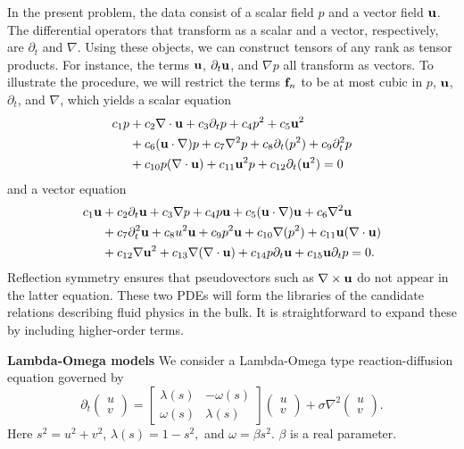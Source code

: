 \documentclass[
 reprint,
 amsmath,amssymb,
 aps,
]{revtex4-2}
\begin{document}
In the present problem, the data consist of a scalar field $p$ and a vector field ${\bf u}$. The differential operators that transform as a scalar and a vector, respectively, are $\partial_t$ and $\nabla$. Using these objects, we can construct tensors of any rank as tensor products. For instance, the terms ${\bf u}$, $\partial_t{\bf u}$, and $\nabla p$ all transform as vectors. To illustrate the procedure, we will restrict the terms ${\bf f}_n$ to be at most cubic in $p$, ${\bf u}$, $\partial_t$, and $\nabla$, which yields a scalar equation
\begin{equation}
\begin{aligned}
c_1p&+c_2\nabla\cdot{\bf u}+c_3 \partial_t p+c_4p^2+c_5{\bf u}^2\\
&+c_6({\bf u}\cdot\nabla)p+c_7\nabla^2p+c_8\partial_t(p^2)+c_9\partial^2_tp\\
&+c_{10}p(\nabla\cdot {\bf u})+c_{11}{\bf u}^2p+c_{12}\partial_t({\bf u}^2)=0
\label{eq:rank0}
\end{aligned}
\end{equation}
and a vector equation
\begin{equation}
\begin{aligned}
c_1{\bf u}&+c_2\partial_t{\bf u}+c_3\nabla p+c_4p{\bf u}+c_5({\bf u}\cdot\nabla){\bf u}+c_6\nabla^2{\bf u}\\
&+c_7\partial^2_t{\bf u}+c_8u^2{\bf u}
+c_9p^2{\bf u}+c_{10}\nabla (p^2)+c_{11}{\bf u}(\nabla\cdot{\bf u})\\
&+c_{12}\nabla{\bf u}^2+c_{13}\nabla(\nabla\cdot{\bf u})+c_{14}p \partial_t {\bf u}+c_{15}{\bf u} \partial_t p = 0.
\label{eq:rank1}
\end{aligned}
\end{equation}
Reflection symmetry ensures that pseudovectors such as $\nabla\times{\bf u}$ do not appear in the latter equation.
These two PDEs will form the libraries of the candidate relations describing fluid physics in the bulk. It is straightforward to expand these by including higher-order terms.


{\bf Lambda-Omega models} We consider a Lambda-Omega type reaction-diffusion equation governed by 
\begin{equation}
\partial_t \begin{pmatrix} u \\ v \end{pmatrix} = \begin{bmatrix} \lambda(s) & - \omega(s) \\
\omega(s) & \lambda(s) \end{bmatrix} \begin{pmatrix} u \\ v \end{pmatrix} + \sigma \nabla^2 \begin{pmatrix} u \\ v \end{pmatrix}.
\end{equation}
Here $s^2 = u^2 + v^2$, $\lambda(s) = 1-s^2, $ and $\omega = \beta s^2$. $\beta$ is a real parameter.
\end{document}
